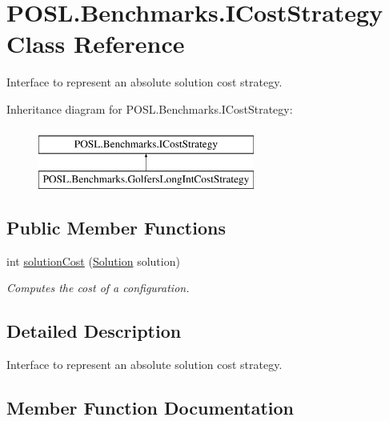 \hypertarget{interfacePOSL_1_1Benchmarks_1_1ICostStrategy}{}\section{P\+O\+S\+L.\+Benchmarks.\+I\+Cost\+Strategy Class Reference}
\label{interfacePOSL_1_1Benchmarks_1_1ICostStrategy}


Interface to represent an absolute solution cost strategy.  


Inheritance diagram for P\+O\+S\+L.\+Benchmarks.\+I\+Cost\+Strategy\+:\begin{figure}[H]
\begin{center}
\leavevmode
\includegraphics[height=2.000000cm]{interfacePOSL_1_1Benchmarks_1_1ICostStrategy}
\end{center}
\end{figure}
\subsection*{Public Member Functions}
\begin{DoxyCompactItemize}
\item 
int \hyperlink{interfacePOSL_1_1Benchmarks_1_1ICostStrategy_a20e3fd9e166a033eb0c395986967047f}{solution\+Cost} (\hyperlink{classPOSL_1_1Data_1_1Solution}{Solution} solution)
\begin{DoxyCompactList}\small\item\em Computes the cost of a configuration. \end{DoxyCompactList}\end{DoxyCompactItemize}


\subsection{Detailed Description}
Interface to represent an absolute solution cost strategy. 

\subsection{Member Function Documentation}
\mbox{\label{interfacePOSL_1_1Benchmarks_1_1ICostStrategy_a20e3fd9e166a033eb0c395986967047f}} 
